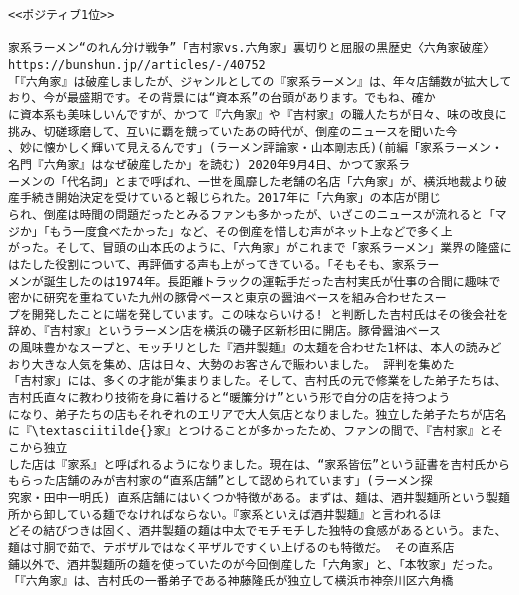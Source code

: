 \documentclass[11pt]{article}
\begin{document}
    \begin{Verbatim}[commandchars=\\\{\}]
<<ポジティブ1位>>

家系ラーメン“のれん分け戦争”「吉村家vs.六角家」裏切りと屈服の黒歴史〈六角家破産〉
https://bunshun.jp//articles/-/40752
「『六角家』は破産しましたが、ジャンルとしての『家系ラーメン』は、年々店舗数が拡大しており、今が最盛期です。その背景には“資本系”の台頭があります。でもね、確か
に資本系も美味しいんですが、かつて『六角家』や『吉村家』の職人たちが日々、味の改良に挑み、切磋琢磨して、互いに覇を競っていたあの時代が、倒産のニュースを聞いた今
、妙に懐かしく輝いて見えるんです」(ラーメン評論家・山本剛志氏)(前編「家系ラーメン・名門『六角家』はなぜ破産したか」を読む) 2020年9月4日、かつて家系ラ
ーメンの「代名詞」とまで呼ばれ、一世を風靡した老舗の名店「六角家」が、横浜地裁より破産手続き開始決定を受けていると報じられた。2017年に「六角家」の本店が閉じ
られ、倒産は時間の問題だったとみるファンも多かったが、いざこのニュースが流れると「マジか」「もう一度食べたかった」など、その倒産を惜しむ声がネット上などで多く上
がった。そして、冒頭の山本氏のように、「六角家」がこれまで「家系ラーメン」業界の隆盛にはたした役割について、再評価する声も上がってきている。「そもそも、家系ラー
メンが誕生したのは1974年。長距離トラックの運転手だった吉村実氏が仕事の合間に趣味で密かに研究を重ねていた九州の豚骨ベースと東京の醤油ベースを組み合わせたスー
プを開発したことに端を発しています。この味ならいける! と判断した吉村氏はその後会社を辞め、『吉村家』というラーメン店を横浜の磯子区新杉田に開店。豚骨醤油ベース
の風味豊かなスープと、モッチリとした『酒井製麺』の太麺を合わせた1杯は、本人の読みどおり大きな人気を集め、店は日々、大勢のお客さんで賑わいました。 評判を集めた
「吉村家」には、多くの才能が集まりました。そして、吉村氏の元で修業をした弟子たちは、吉村氏直々に教わり技術を身に着けると“暖簾分け”という形で自分の店を持つよう
になり、弟子たちの店もそれぞれのエリアで大人気店となりました。独立した弟子たちが店名に『\textasciitilde{}家』とつけることが多かったため、ファンの間で、『吉村家』とそこから独立
した店は『家系』と呼ばれるようになりました。現在は、“家系皆伝”という証書を吉村氏からもらった店舗のみが吉村家の“直系店舗”として認められています」(ラーメン探
究家・田中一明氏) 直系店舗にはいくつか特徴がある。まずは、麺は、酒井製麺所という製麺所から卸している麺でなければならない。『家系といえば酒井製麺』と言われるほ
どその結びつきは固く、酒井製麺の麺は中太でモチモチした独特の食感があるという。また、麺は寸胴で茹で、テボザルではなく平ザルですくい上げるのも特徴だ。 その直系店
鋪以外で、酒井製麺所の麺を使っていたのが今回倒産した「六角家」と、「本牧家」だった。「『六角家』は、吉村氏の一番弟子である神藤隆氏が独立して横浜市神奈川区六角橋

\end{Verbatim}
\end{document}
